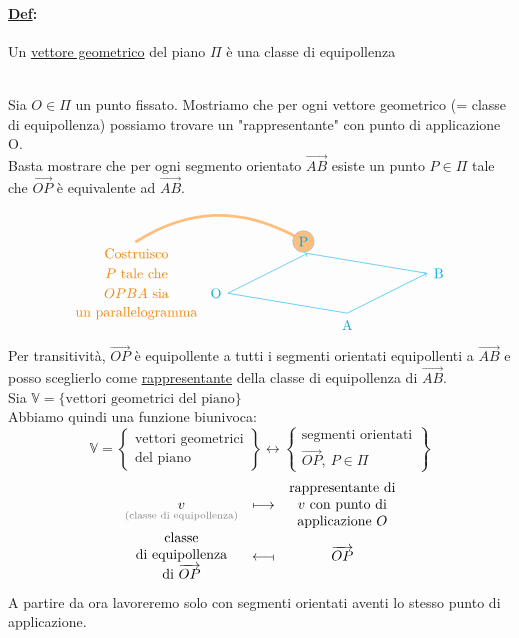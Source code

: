 \documentclass{article}
\newcommand{\ul}[1]{\underline{#1}}
\newcommand{\V}{\mathbb{V}}
\newcommand{\Def}[2]{\paragraph{\ul{Def}:}#1\\\hspace*{3em}\begin{minipage}{.8\textwidth}#2\end{minipage}}
\newcommand{\colort}[2]{\text{\color{#1}#2}}
\begin{document}
	\Def{Un \ul{vettore geometrico} del piano $\Pi$ è una classe di equipollenza}{}\\
	Sia $O\in\Pi$ un punto fissato. Mostriamo che per ogni vettore geometrico (= classe di equipollenza) possiamo trovare un "rappresentante" con punto di applicazione O.\\
	Basta mostrare che per ogni segmento orientato $\overrightarrow{AB}$ esiste un punto $P\in\Pi$ tale che $\overrightarrow{OP}$ è equivalente ad $\overrightarrow{AB}$.
	\begin{displaymath}
		\begin{tikzpicture}
			\begin{scope}[cyan]
				\draw[->] (0,0) -- (2,1);
				\draw (-0.3,0) node {O};
				\draw (1.9,1.3) node[shape=circle,draw,fill=orange,opacity=0.5,inner sep=2pt] {P};
				\draw (1.9,1.3) node {P};
				\path[orange,line width=2, opacity=0.5, line cap=round] (1.65,1.45) edge[bend right] node [left] {} (-2.3,1.3);
				\begin{scope}[shift={(-2.3,0)},orange]
					\draw (0,1) node {Costruisco};
					\draw (0,0.5) node {$P$ tale che};
					\draw (0,0) node {$OPBA$ sia};
					\draw (0,-0.5) node {un parallelogramma};
				\end{scope}
				\draw[->] (3,-0.5) -- (5,0.5);
				\draw (3,-0.8) node {A};
				\draw (5.3,0.5) node {B};
				\draw (3,-0.5) -- (0,0);
				\draw (2,1) -- (5,0.5);
			\end{scope}
		\end{tikzpicture}
	\end{displaymath}
	Per transitività, $\overrightarrow{OP}$ è equipollente a tutti i segmenti orientati equipollenti a $\overrightarrow{AB}$ e posso sceglierlo come \ul{rappresentante} della classe di equipollenza di $\overrightarrow{AB}$.\\
	Sia $\V=\{\text{vettori geometrici del piano}\}$\\
	Abbiamo quindi una funzione biunivoca:\\
	$$\V=\begin{Bmatrix}\text{vettori geometrici}\\\text{del piano}\end{Bmatrix}\leftrightarrow\begin{Bmatrix}\text{segmenti orientati}\\\overrightarrow{OP},\ P\in\Pi\end{Bmatrix}$$
	$$\begin{matrix}\underset{\colort{gray}{(classe di equipollenza)}}{v}&\longmapsto&\begin{matrix}\text{rappresentante di}\\\text{$v$ con punto di}\\\text{applicazione $O$}\end{matrix}\\\begin{matrix}\text{classe}\\\text{di equipollenza}\\\text{di }\overrightarrow{OP}\end{matrix}&\longleftarrow\!\shortmid&\overrightarrow{OP}\end{matrix}$$
	A partire da ora lavoreremo solo con segmenti orientati aventi lo stesso punto di applicazione.
\end{document}
